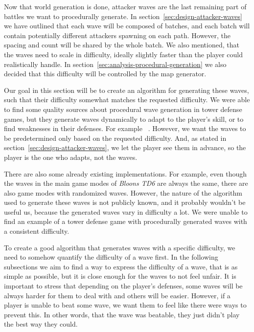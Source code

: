 Now that world generation is done, attacker waves are the last remaining part of battles we want to procedurally generate.
In section~\ref{sec:design-attacker-waves} we have outlined that each wave will be composed of batches, and each batch will contain potentially different attackers spawning on each path.
However, the spacing and count will be shared by the whole batch.
We also mentioned, that the waves need to scale in difficulty, ideally slightly faster than the player could realistically handle.
In section~\ref{sec:analysis-procedural-generation} we also decided that this difficulty will be controlled by the map generator.

Our goal in this section will be to create an algorithm for generating these waves, such that their difficulty somewhat matches the requested difficulty.
We were able to find some quality sources about procedural wave generation in tower defense games, but they generate waves dynamically to adapt to the player's skill, or to find weaknesses in their defenses.
For example~\cite{NeatWaves} .
However, we want the waves to be predetermined only based on the requested difficulty.
And, as stated in section~\ref{sec:design-attacker-waves}, we let the player see them in advance, so the player is the one who adapts, not the waves.

There are also some already existing implementations.
For example, even though the waves in the main game modes of \emph{Bloons TD6} are always the same, there are also game modes with randomized waves.
However, the nature of the algorithm used to generate these waves is not publicly known, and it probably wouldn't be useful us, because the generated waves vary in difficulty a lot.
We were unable to find an example of a tower defense game with procedurally generated waves with a consistent difficulty.

To create a good algorithm that generates waves with a specific difficulty, we need to somehow quantify the difficulty of a wave first.
In the following subsections we aim to find a way to express the difficulty of a wave, that is as simple as possible, but it is close enough for the waves to not feel unfair.
It is important to stress that depending on the player's defenses, some waves will be always harder for them to deal with and others will be easier.
However, if a player is unable to beat some wave, we want them to feel like there were ways to prevent this.
In other words, that the wave was beatable, they just didn't play the best way they could.

